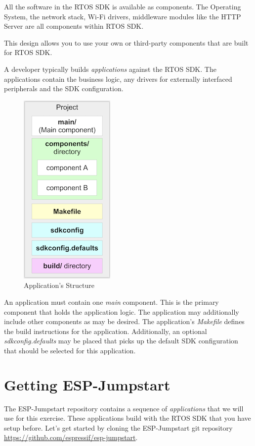 \documentclass[main.tex]{subfiles}
\begin{document}
All the software in the RTOS SDK is available as components. The Operating System, the network stack, Wi-Fi drivers, middleware modules like the HTTP Server are all components within RTOS SDK. 

This design allows you to use your own or third-party components that are built for RTOS SDK.

A developer typically builds \textit{applications} against the RTOS SDK. The applications contain the business logic, any drivers for externally interfaced peripherals and the SDK configuration.

\begin{figure}[h!]
    \centering
    \includegraphics[scale=0.6]{../../_static/app_structure.png}
    \caption{Application's Structure}
    \label{fig:app_structure}
\end{figure}

An application must contain one \textit{main} component. This is the primary component that holds the application logic. The application may additionally include other components as may be desired.
The application's \textit{Makefile} defines the build instructions for the application. 
Additionally, an optional \textit{sdkconfig.defaults} may be placed that picks up the default SDK configuration that should be selected for this application.


\section{Getting ESP-Jumpstart}

The ESP-Jumpstart repository contains a sequence of \textit{applications} that we will use for this exercise. These applications build with the RTOS SDK that you have setup before. Let's get started by cloning the ESP-Jumpstart git repository \url{https://github.com/espressif/esp-jumpstart}. 
\end{document}

